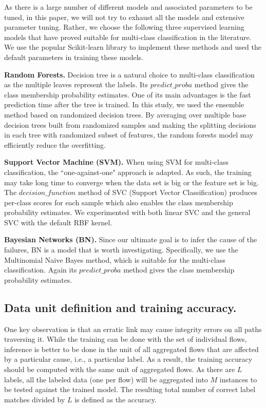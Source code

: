 As there is a large number of different models and associated parameters to be tuned, in this paper, we will not try to exhaust all the models and extensive parameter tuning. Rather, we choose the following three supervised learning models that have proved suitable for multi-class classification in the literature. We use the popular Scikit-learn library to implement these methods and used the default parameters in training these models. 

{\bf Random Forests.}  Decision tree is a natural choice to multi-class classification as the multiple leaves represent the labels. Its $predict\_proba$ method gives the class membership probability estimates. One of its main advantages is the fast prediction time after the tree is trained. In this study, we used the ensemble method based on randomized decision trees. By averaging over multiple base decision trees built from randomized samples and making the splitting decisions in each tree with randomized subset of features, the random forests model may efficiently reduce the overfitting. 

{\bf Support Vector Machine (SVM).} When using SVM for multi-class classification, the ``one-against-one" approach is adapted. As such, the training may take long time to converge when the data set is big or the feature set is big. The $decision\_function$ method of SVC (Support Vector Classification) produces per-class scores for each sample which also enables the class membership probability estimates. We experimented with both linear SVC and the general SVC with the default RBF kernel.

{\bf Bayesian Networks (BN).} Since our ultimate goal is to infer the cause of the failures, BN is a model that is worth investigating. Specifically, we use the Multinomial Naive Bayes method, which is suitable for the multi-class classification. Again its $predict\_proba$ method gives the class membership probability estimates.

\subsection{Data unit definition and training accuracy.}
One key observation is that an erratic link may cause integrity errors on all paths traversing it. While the training can be done with the set of individual flows, inference is better to be done in the unit of all aggregated flows that are affected by a particular cause, i.e., a particular label. As a result, the training accuracy should be computed with the same unit of aggregated flows. As there are $L$ labels, all the labeled data (one per flow) will be aggregated into $M$ instances to be tested against the trained model. The resulting total number of correct label matches divided by $L$ is defined as the accuracy.

